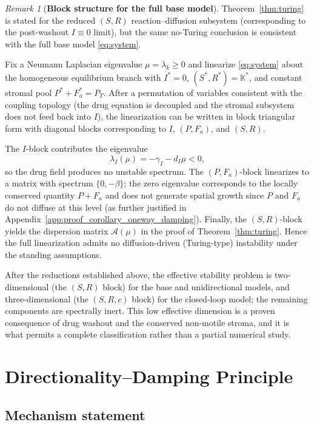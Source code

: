 \documentclass[pdflatex,sn-mathphys-ay]{sn-jnl}
\theoremstyle{thmstyleone}
\theoremstyle{definition}
\theoremstyle{remark}
\newtheorem{remark}[theorem]{Remark}
\begin{document}
\begin{remark}[\textbf{Block structure for the full base model}]
\label{rmk:block_structure}
Theorem~\ref{thm:turing} is stated for the reduced $(S,R)$ reaction--diffusion subsystem (corresponding to the post-washout $I\equiv 0$ limit), but the same no-Turing conclusion is consistent with the full base model \eqref{eq:system}.

Fix a Neumann Laplacian eigenvalue $\mu=\lambda_k\ge 0$ and linearize \eqref{eq:system} about the homogeneous equilibrium branch with $I^*=0$, $(S^*,R^*)=\mathbb{K}^*$, and constant stromal pool $P^*+F_a^*=P_T$. 
After a permutation of variables consistent with the coupling topology (the drug equation is decoupled and the stromal subsystem does not feed back into $I$), the linearization can be written in block triangular form with diagonal blocks corresponding to $I$, $(P,F_a)$, and $(S,R)$.

The $I$-block contributes the eigenvalue
\[
\lambda_I(\mu)=-\gamma_I-d_I\mu<0,
\]
so the drug field produces no unstable spectrum. 
The $(P,F_a)$-block linearizes to a matrix with spectrum $\{0,-\beta\}$; the zero eigenvalue corresponds to the locally conserved quantity $P+F_a$ and does not generate spatial growth since $P$ and $F_a$ do not diffuse at this level (as further justified in Appendix~\ref{app:proof_corollary_oneway_damping}). 
Finally, the $(S,R)$-block yields the dispersion matrix $\mathcal{A}(\mu)$ in the proof of Theorem~\ref{thm:turing}. 
Hence the full linearization admits no diffusion-driven (Turing-type) instability under the standing assumptions.
\end{remark}

After the reductions established above, the effective stability problem is
two-dimensional (the $(S,R)$ block) for the base and unidirectional models, and
three-dimensional (the $(S,R,c)$ block) for the closed-loop model; the remaining
components are spectrally inert. This low effective dimension is a proven
consequence of drug washout and the conserved non-motile stroma, and it is what
permits a complete classification rather than a partial numerical study.

\section{Directionality--Damping Principle}\label{sec:chemotaxis}

\subsection{Mechanism statement}
\label{subsec:mechanism_statement}
\end{document}
